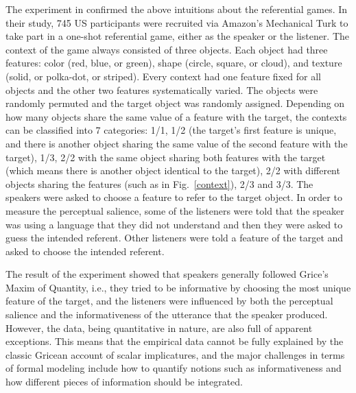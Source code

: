 The experiment in \cite{Frank} confirmed the above intuitions about the 
referential games. 
In their study, 745 US participants were recruited via 
Amazon’s Mechanical Turk to take part in a one-shot referential game, either 
as the speaker or the listener. 
The context of the game always consisted of three objects. 
Each object had three features: color (red, blue, or green), shape 
(circle, square, or cloud), and texture (solid, or polka-dot, or striped).
Every context had one feature fixed for all objects and the other two features
systematically varied. 
The objects were randomly permuted and the target object was randomly assigned. 
Depending on how many objects share the same value of a feature with the target, 
the contexts can be classified into 7 categories: 1/1, 1/2 (the target's 
first feature is unique, and there is another object sharing the same value of
the second feature with the target), 1/3, 2/2 with the same object sharing both
features with the target (which means there is another object identical to the 
target), 2/2 with different objects sharing the features (such as in 
Fig.~\ref{context}), 2/3 and 3/3. 
The speakers were asked to choose a feature to refer to the target object. 
In order to measure the perceptual salience, some of the listeners were told 
that the speaker was using a language that they did not understand and then 
they were asked to guess the intended referent. 
Other listeners were told a feature of the target and asked to choose the 
intended referent. 

The result of the experiment showed that speakers generally followed 
Grice's Maxim of Quantity, i.e., they tried to be informative by choosing the 
most unique feature of the target, and the listeners were influenced by both 
the perceptual salience and the informativeness of the utterance that the 
speaker produced. 
However, the data, being quantitative in nature, are also full of apparent 
exceptions. 
This means that the empirical data cannot be fully explained by the classic 
Gricean account of scalar implicatures, and the major challenges in terms of 
formal modeling include how to quantify notions
such as informativeness and how different pieces of information should
be integrated.

